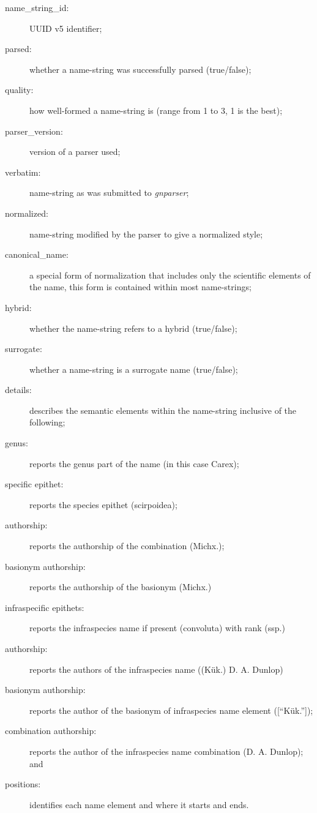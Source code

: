 \documentclass{bmcart}
\begin{document}
\begin{description}

  \item[name\_string\_id:] UUID v5 identifier;

  \item[parsed:] whether a name-string was successfully parsed (true/false);

  \item[quality:] how well-formed a name-string is (range from 1 to 3, 1 is the best);

  \item[parser\_version:] version of a parser used; \item[verbatim:] name-string as was submitted to \textit{gnparser}; \item[normalized:] name-string modified by the parser to give a normalized style;

  \item[canonical\_name:] a special form of normalization that includes only the scientific elements of the name, this form is contained within most name-strings; \item[hybrid:] whether the name-string refers to a hybrid (true/false); \item[surrogate:] whether a name-string is a surrogate name (true/false); \item[details:] describes the semantic elements within the name-string inclusive of the following;

  \item[genus:] reports the genus part of the name (in this case Carex);

  \item[specific epithet:] reports the species epithet (scirpoidea);

  \item[authorship:] reports the authorship of the combination (Michx.);

  \item[basionym authorship:] reports the authorship of the basionym (Michx.)

  \item[infraspecific epithets:] reports the infraspecies name if present (convoluta) with rank (ssp.) \item[authorship:] reports the authors of the infraspecies name ((Kük.) D. A. Dunlop) \item[basionym authorship:] reports the author of the basionym of infraspecies name element ([``Kük.'']);

  \item[combination authorship:] reports the author of the infraspecies name combination (D. A. Dunlop); and \item[positions:] identifies each name element and where it starts and ends.

\end{description}
\end{document}
